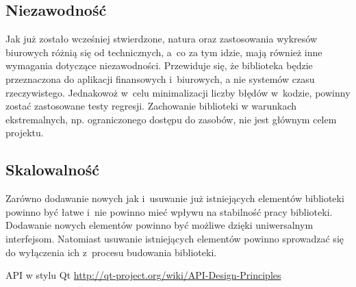 \subsection{Niezawodność}
Jak już zostało wcześniej stwierdzone, natura oraz zastosowania wykresów biurowych różnią się od technicznych, a~co za tym idzie, mają również inne wymagania dotyczące niezawodności. Przewiduje się, że biblioteka będzie przeznaczona do aplikacji finansowych i~biurowych, a nie systemów czasu rzeczywistego. Jednakowoż w~celu minimalizacji liczby błędów w~kodzie, powinny zostać zastosowane testy regresji. Zachowanie biblioteki w warunkach ekstremalnych, np. ograniczonego dostępu do zasobów, nie jest głównym celem projektu.


\subsection{Skalowalność}
Zarówno dodawanie nowych jak i~usuwanie już istniejących elementów biblioteki powinno być łatwe i~nie powinno mieć wpływu na stabilność pracy biblioteki. Dodawanie nowych elementów powinno być możliwe dzięki uniwersalnym interfejsom. Natomiast usuwanie istniejących elementów powinno sprowadzać się do wyłączenia ich z~procesu budowania biblioteki.


\begin{thebibliography}{}




API w stylu Qt \url{http://qt-project.org/wiki/API-Design-Principles}

\end{thebibliography}
